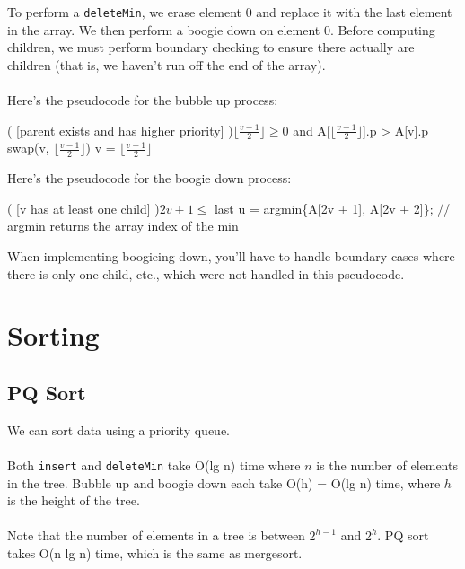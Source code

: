 \documentclass[]{article}
\theoremstyle{definition}
\begin{document}
\begin{enumerate}
						To perform a \verb+deleteMin+, we erase element 0 and replace it with the last element in the array. We then perform a boogie down on element 0. Before computing children, we must perform boundary checking to ensure there actually are children (that is, we haven't run off the end of the array).
						\\ \\
						Here's the pseudocode for the bubble up process: \\
						\begin{algorithm}[H]
							\While( [parent exists and has higher priority] ){$\lfloor \frac{v - 1}{2} \rfloor \ge 0$ and A[$\lfloor \frac{v - 1}{2} \rfloor$].p > A[v].p}{ 
								swap(v, $\lfloor \frac{v - 1}{2} \rfloor$)\;
								v = $\lfloor \frac{v - 1}{2} \rfloor$\;
							}
						\end{algorithm}

						Here's the pseudocode for the boogie down process: \\
						\begin{algorithm}[H]
							\While( [v has at least one child] ){$2v + 1 \le$ last}{
								u = argmin\{A[2v + 1], A[2v + 2]\}; // argmin returns the array index of the min \\
							}
						\end{algorithm}
						
						When implementing boogieing down, you'll have to handle boundary cases where there is only one child, etc., which were not handled in this pseudocode.
				\end{enumerate}
	\section{Sorting}
		\subsection{PQ Sort}
			We can sort data using a priority queue. \\ \\
			Both \verb+insert+ and \verb+deleteMin+ take O(lg n) time where $n$ is the number of elements in the tree. Bubble up and boogie down each take O(h) = O(lg n) time, where $h$ is the height of the tree.
			\\ \\
			Note that the number of elements in a tree is between $2^{h - 1}$ and $2^h$. PQ sort takes O(n lg n) time, which is the same as mergesort.
		
\end{document}
